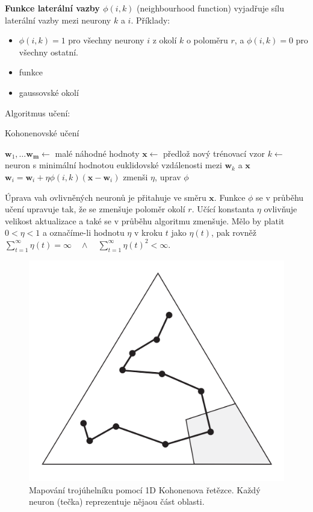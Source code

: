 \documentclass[11pt]{report} %
\renewcommand{\vec}[1]{\mathbf{#1}}
\numberwithin{equation}{section}
\begin{document}
\textbf{Funkce laterální vazby $\phi(i,k)$} (neighbourhood function) vyjadřuje sílu laterální vazby mezi neurony $k$ a $i$. Příklady:
\begin{itemize}
	\item $\phi(i,k) = 1$ pro všechny neurony $i$ z okolí $k$ o poloměru $r$, a $\phi(i,k) = 0$ pro všechny ostatní.
	\item funkce 
	\item gaussovské okolí
\end{itemize}

Algoritmus učení:
\bigskip
\begin{algorithm}[H]
	\caption{Kohonenovské učení}
	\begin{algorithmic}[1]
			\State $\vec{w}_1, \dots \vec{w_m} \gets $ malé náhodné hodnoty
				\State $\vec{x} \gets $ předlož nový trénovací vzor
				\State $k \gets$ neuron s minimální hodnotou euklidovské vzdálenosti mezi $\vec{w}_k$ a $\vec{x}$
					\State $\vec{w}_i = \vec{w}_i + \eta\phi(i,k)(\vec{x} - \vec{w}_i)$
				\EndFor
				\State zmenši $\eta$, uprav $\phi$
			\EndWhile
		\EndFunction
	\end{algorithmic}
\end{algorithm}	

Úprava vah ovlivněných neuronů je přitahuje ve směru $\vec{x}$. Funkce $\phi$ se v průběhu učení upravuje tak, že se zmenšuje poloměr okolí $r$. Učící konstanta $\eta$ ovlivňuje velikost aktualizace a také se v průběhu algoritmu zmenšuje. Mělo by platit $0 < \eta < 1$ a označíme-li hodnotu $\eta$ v kroku $t$ jako $\eta(t)$, pak rovněž $\sum_{t=1}^{\infty}\eta(t) = \infty \quad \wedge \quad \sum_{t=1}^{\infty}\eta(t)^2 < \infty$.

\begin{figure}[h]
	\centering
	\includegraphics[scale=0.7]{img/kohonen_triangle.png}
	\caption{Mapování trojúhelníku pomocí 1D Kohonenova řetězce. Každý neuron (tečka) reprezentuje nějaou část oblasti.}
\end{figure}
\end{document}
